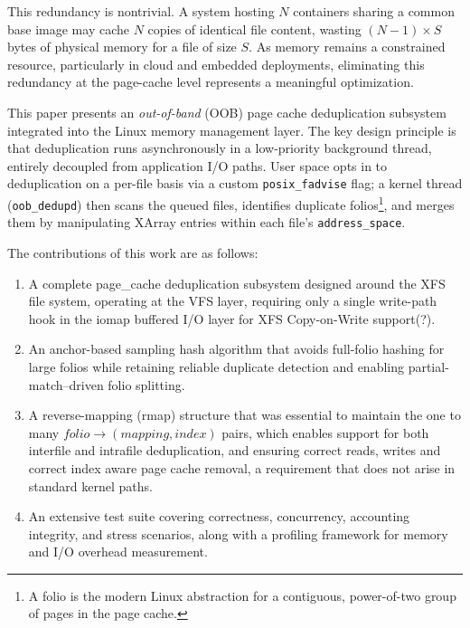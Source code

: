 \documentclass[conference]{IEEEtran}
\begin{document}
This redundancy is nontrivial. A system hosting $N$ containers sharing a common base image may cache $N$ copies of identical file content, wasting $(N{-}1) \times S$ bytes of physical memory for a file of size $S$. As memory remains a constrained resource, particularly in cloud and embedded deployments, eliminating this redundancy at the page-cache level represents a meaningful optimization.

This paper presents an \emph{out-of-band} (OOB) page cache deduplication subsystem integrated into the Linux memory management layer. The key design principle is that deduplication runs asynchronously in a low-priority background thread, entirely decoupled from application I/O paths. User space opts in to deduplication on a per-file basis via a custom \texttt{posix\_fadvise} flag; a kernel thread (\texttt{oob\_dedupd}) then scans the queued files, identifies duplicate folios\footnote{A folio is the modern Linux abstraction for a contiguous, power-of-two group of pages in the page cache.}, and merges them by manipulating XArray entries within each file's \texttt{address\_space}.

The contributions of this work are as follows:
\begin{enumerate}
    \item A complete page\_cache deduplication subsystem designed around the XFS file system, operating at the VFS layer, requiring only a single write-path hook in the iomap buffered I/O layer for XFS Copy-on-Write support(?).
    \item An anchor-based sampling hash algorithm that avoids full-folio hashing for large folios while retaining reliable duplicate detection and enabling partial-match--driven folio splitting.
    \item A reverse-mapping (rmap) structure that was essential to maintain the one to many $folio \rightarrow (mapping,index)$ pairs, which enables support for both interfile and intrafile deduplication, and ensuring correct reads, writes and correct index aware page cache removal, a requirement that does not arise in standard kernel paths.
    \item An extensive test suite covering correctness, concurrency, accounting integrity, and stress scenarios, along with a profiling framework for memory and I/O overhead measurement.
\end{enumerate}
\end{document}
